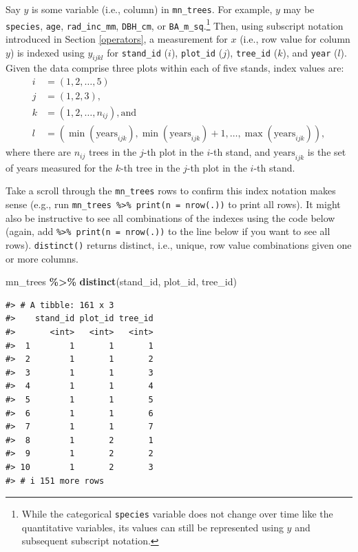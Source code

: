 \documentclass[
  11pt,
]{krantz}
\newenvironment{Shaded}{\begin{snugshade}}{\end{snugshade}}
\newcommand{\KeywordTok}[1]{\textcolor[rgb]{0.13,0.29,0.53}{\textbf{#1}}}
\newcommand{\NormalTok}[1]{#1}
\newcommand{\OperatorTok}[1]{\textcolor[rgb]{0.81,0.36,0.00}{\textbf{#1}}}
\newcommand{\StringTok}[1]{\textcolor[rgb]{0.31,0.60,0.02}{#1}}
\theoremstyle{definition}
\theoremstyle{definition}
\theoremstyle{definition}
\theoremstyle{definition}
\theoremstyle{remark}
\begin{document}
Say \(y\) is some variable (i.e., column) in \texttt{mn\_trees}. For example, \(y\) may be \texttt{species}, \texttt{age}, \texttt{rad\_inc\_mm}, \texttt{DBH\_cm}, or \texttt{BA\_m\_sq}.\footnote{While the categorical \texttt{species} variable does not change over time like the quantitative variables, its values can still be represented using \(y\) and subsequent subscript notation.} Then, using subscript notation introduced in Section \ref{operators}, a measurement for \(x\) (i.e., row value for column \(y\)) is indexed using \(y_{ijkl}\) for \texttt{stand\_id} (\(i\)), \texttt{plot\_id} (\(j\)), \texttt{tree\_id} (\(k\)), and \texttt{year} (\(l\)). Given the data comprise three plots within each of five stands, index values are:
\begin{align*}
i &= (1, 2, \ldots, 5)\\
j &= (1, 2, 3),\\
k &= (1,2,\ldots, n_{ij}), \text{and}\\
l &= \left(\min(\text{years}_{ijk}), \min(\text{years}_{ijk})+1, \ldots, \max(\text{years}_{ijk})\right), 
\end{align*}\label{page:treesIndexes}
where there are \(n_{ij}\) trees in the \(j\)-th plot in the \(i\)-th stand, and \(\text{years}_{ijk}\) is the set of years measured for the \(k\)-th tree in the \(j\)-th plot in the \(i\)-th stand.

Take a scroll through the \texttt{mn\_trees} rows to confirm this index notation makes sense (e.g., run \texttt{mn\_trees\ \%\textgreater{}\%\ print(n\ =\ nrow(.))} to print all rows). It might also be instructive to see all combinations of the indexes using the code below (again, add \texttt{\%\textgreater{}\%\ print(n\ =\ nrow(.))} to the line below if you want to see all rows). \texttt{distinct()} returns distinct, i.e., unique, row value combinations given one or more columns.

\begin{Shaded}
\begin{Highlighting}[]
\NormalTok{mn\_trees }\OperatorTok{\%\textgreater{}\%}\StringTok{ }\KeywordTok{distinct}\NormalTok{(stand\_id, plot\_id, tree\_id)}
\end{Highlighting}
\end{Shaded}

\begin{verbatim}
#> # A tibble: 161 x 3
#>    stand_id plot_id tree_id
#>       <int>   <int>   <int>
#>  1        1       1       1
#>  2        1       1       2
#>  3        1       1       3
#>  4        1       1       4
#>  5        1       1       5
#>  6        1       1       6
#>  7        1       1       7
#>  8        1       2       1
#>  9        1       2       2
#> 10        1       2       3
#> # i 151 more rows
\end{verbatim}
\end{document}
